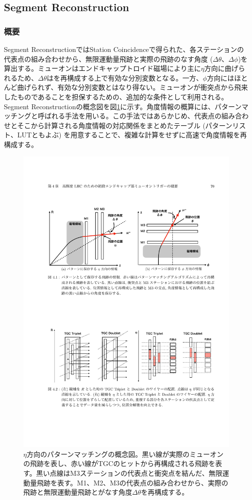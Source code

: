 \subsection{Segment Reconstruction}
\label{subsec:segment_reco}
\subsubsection*{概要}
Segment ReconstructionではStation Coincidenceで得られた、各ステーションの代表点の組み合わせから、無限運動量飛跡と実際の飛跡のなす角度 ($\Delta\theta$、$\Delta\phi$)を算出する。ミューオンはエンドキャップトロイド磁場により主に$\eta$方向に曲げられるため、$\Delta\theta$は\pt を再構成する上で有効な分別変数となる。一方、$\phi$方向にはほとんど曲げられず、有効な分別変数とはなり得ない。ミューオンが衝突点から飛来したものであることを担保するための、追加的な条件として利用される。Segment Reconstructionの概念図を図\ref{Concept_segment}に示す。角度情報の概算には、パターンマッチングと呼ばれる手法を用いる。この手法ではあらかじめ、代表点の組み合わせとそこから計算される角度情報の対応関係をまとめたテーブル (パターンリスト、LUTともよぶ) を用意することで、複雑な計算をせずに高速で角度情報を再構成する。

\begin{figure} 
\centering
\includegraphics[width=12cm]{fig/SL/Concept_segment.pdf}
\caption[Segment Reconstructionのコンセプト]{$\eta$方向のパターンマッチングの概念図\cite{mt_mino}。黒い線が実際のミューオンの飛跡を表し、赤い線がTGCのヒットから再構成される飛跡を表す。黒い点線はM3ステーションの代表点と衝突点を結んだ、無限運動量飛跡を表す。M1、M2、M3の代表点の組み合わせから、実際の飛跡と無限運動量飛跡とがなす角度$\Delta\theta$を再構成する。}
\label{Concept_segment}
\end{figure}

